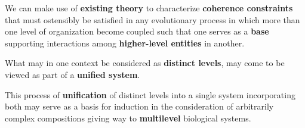 \begin{frame}
\begin{block}{}
We can make use of \textbf{existing theory} to characterize \textbf{coherence constraints} that must ostensibly be satisfied in any evolutionary process in which more than one level of organization become coupled such that one serves as a \textbf{base} supporting interactions among \textbf{higher-level entities} in another. 
\end{block}
\begin{block}{}
What may in one context be considered as \textbf{distinct levels}, may come to be viewed as part of a \textbf{unified system}.
\end{block}
\begin{block}{}
This process of \textbf{unification} of distinct levels into a single system incorporating both may serve as a basis for induction in the consideration of arbitrarily complex compositions giving way to \textbf{multilevel} biological systems.
\end{block}
\end{frame}